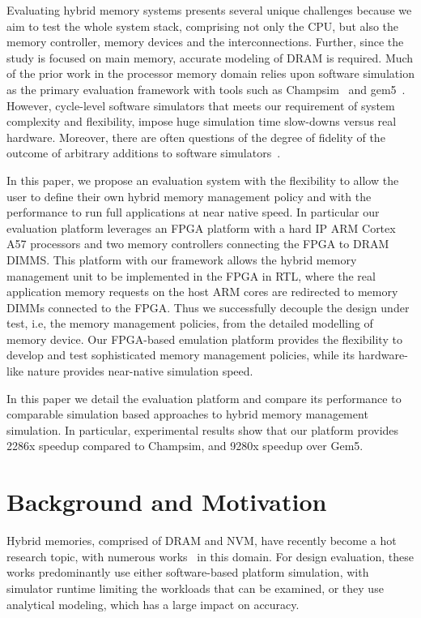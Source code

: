 \documentclass[conference]{IEEEtran}
\begin{document}
Evaluating hybrid memory systems presents several unique challenges
because we aim to test the whole system stack, comprising not only the
CPU, but also the memory controller, memory devices and the
interconnections.  Further, since the study is focused on main memory,
accurate modeling of DRAM is required.  Much of the prior work in the
processor memory domain relies upon software simulation as the primary
evaluation framework with tools such as Champsim~\cite{champsim} and
gem5~\cite{gem5}. However, cycle-level software simulators that meets our requirement of system complexity and flexibility, impose huge simulation
time slow-downs versus real hardware. Moreover, there are often
questions of the degree of fidelity of the outcome of arbitrary
additions to software simulators~\cite{7155440}.

In this paper, we propose an evaluation system with the flexibility to
allow the user to define their own hybrid memory management policy and
with the performance to run full applications at near native speed.
In particular our evaluation platform leverages an FPGA platform with
a hard IP ARM Cortex A57 processors and two memory controllers
connecting the FPGA to DRAM DIMMS.  This platform with our framework
allows the hybrid memory management unit to be implemented in the FPGA
in RTL, where the real application memory requests on the host ARM
cores are redirected to memory DIMMs connected to the FPGA. Thus we
successfully decouple the design under test, i.e, the memory
management policies, from the detailed modelling of memory device. Our
FPGA-based emulation platform provides the flexibility to develop and
test sophisticated memory management policies, while its hardware-like
nature provides near-native simulation speed.

In this paper we detail the evaluation platform and compare its
performance to comparable simulation based approaches to hybrid memory
management simulation.  In particular, experimental results show
that our platform provides 2286x speedup compared to Champsim, and 9280x
speedup over Gem5.
\section{Background and Motivation}
Hybrid memories, comprised of DRAM and NVM, have recently become a hot
research topic, with numerous works~\cite{Hassan:2015,span,
  Liu:2017,ramos, CSu} in this domain.  For design evaluation, these
works predominantly use either software-based platform simulation,
with simulator runtime limiting the workloads that can be examined, or
they use analytical modeling, which has a large impact on accuracy.
\end{document}
